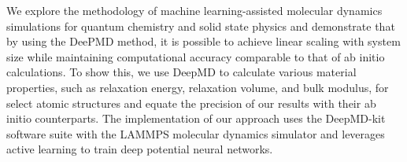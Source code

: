 We explore the methodology of machine learning-assisted molecular dynamics
simulations for quantum chemistry and solid state physics and demonstrate that
by using the DeePMD method, it is possible to achieve linear scaling with
system size while maintaining computational accuracy comparable to that of ab
initio calculations. To show this, we use DeepMD to calculate various material
properties, such as relaxation energy, relaxation volume, and bulk modulus,
for select atomic structures and equate the precision of our results with
their ab initio counterparts. The implementation of our approach uses the
DeepMD-kit software suite with the LAMMPS molecular dynamics simulator and
leverages active learning to train deep potential neural networks.

